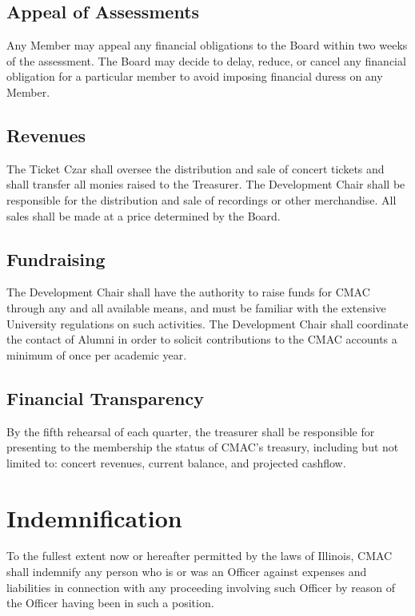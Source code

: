 \documentclass{article}
\begin{document}
\subsection{Appeal of Assessments}

Any Member may appeal any financial obligations to the Board within two weeks of
the assessment. The Board may decide to delay, reduce, or cancel any financial
obligation for a particular member to avoid imposing financial duress on any
Member.

\subsection{Revenues}

The Ticket Czar shall oversee the distribution and sale of concert
tickets and shall transfer all monies raised to the Treasurer. The
Development Chair shall be responsible for the distribution and sale
of recordings or other merchandise. All sales shall be made at a price
determined by the Board.

\subsection{Fundraising}

The Development Chair shall have the authority to raise funds for CMAC through
any and all available means, and must be familiar with the extensive University
regulations on such activities. The Development Chair shall coordinate the
contact of Alumni in order to solicit contributions to the CMAC accounts a
minimum of once per academic year.

\subsection{Financial Transparency}

By the fifth rehearsal of each quarter, the treasurer shall be responsible
for presenting to the membership the status of CMAC's treasury, including
but not limited to: concert revenues, current balance, and projected
cashflow.

\section{Indemnification}

To the fullest extent now or hereafter permitted by the laws of Illinois,
CMAC shall indemnify any person who is or was an Officer against expenses
and liabilities in connection with any proceeding involving such Officer
by reason of the Officer having been in such a position.
\end{document}

